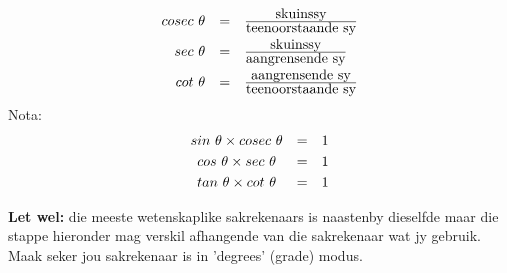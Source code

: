 \begin{equation*}
\begin{array}{ccc}\hfill cosec~\theta & =& \frac{\mbox{skuinssy}}{\mbox{teenoorstaande sy}}\hfill \vspace{3pt}\\
 \hfill sec~\theta & =& \frac{\mbox{skuinssy}}{\mbox{aangrensende sy}}\hfill \vspace{3pt}\\
 \hfill cot~\theta & =& \frac{\mbox{aangrensende sy}}{\mbox{teenoorstaande sy}}\hfill 
\end{array}
\end{equation*}
Nota:
\begin{equation*}
\begin{array}{ccc}sin~\theta \times cosec~\theta & =& 1 \vspace{3pt}\\
 cos~\theta \times sec~\theta & =& 1 \vspace{3pt}\\
tan~\theta \times cot~\theta & =& 1
\end{array}
\end{equation*}


% 
% 
\textbf{Let wel: }die meeste wetenskaplike sakrekenaars is naastenby dieselfde maar die stappe hieronder mag verskil afhangende van die sakrekenaar wat jy gebruik. Maak seker jou sakrekenaar is in 'degrees' (grade) modus. 

